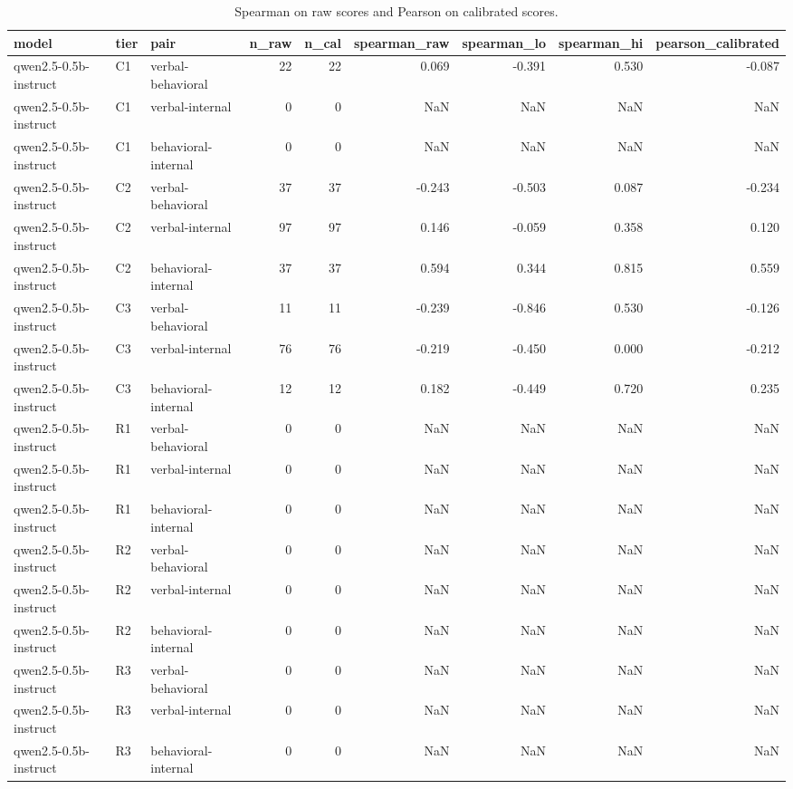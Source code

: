 \begin{table}
\caption{Spearman on raw scores and Pearson on calibrated scores.}
\label{tab:t9_signal_correlations}
\begin{tabular}{lllrrrrrr}
\toprule
model & tier & pair & n\_raw & n\_cal & spearman\_raw & spearman\_lo & spearman\_hi & pearson\_calibrated \\
\midrule
qwen2.5-0.5b-instruct & C1 & verbal-behavioral & 22 & 22 & 0.069 & -0.391 & 0.530 & -0.087 \\
qwen2.5-0.5b-instruct & C1 & verbal-internal & 0 & 0 & NaN & NaN & NaN & NaN \\
qwen2.5-0.5b-instruct & C1 & behavioral-internal & 0 & 0 & NaN & NaN & NaN & NaN \\
qwen2.5-0.5b-instruct & C2 & verbal-behavioral & 37 & 37 & -0.243 & -0.503 & 0.087 & -0.234 \\
qwen2.5-0.5b-instruct & C2 & verbal-internal & 97 & 97 & 0.146 & -0.059 & 0.358 & 0.120 \\
qwen2.5-0.5b-instruct & C2 & behavioral-internal & 37 & 37 & 0.594 & 0.344 & 0.815 & 0.559 \\
qwen2.5-0.5b-instruct & C3 & verbal-behavioral & 11 & 11 & -0.239 & -0.846 & 0.530 & -0.126 \\
qwen2.5-0.5b-instruct & C3 & verbal-internal & 76 & 76 & -0.219 & -0.450 & 0.000 & -0.212 \\
qwen2.5-0.5b-instruct & C3 & behavioral-internal & 12 & 12 & 0.182 & -0.449 & 0.720 & 0.235 \\
qwen2.5-0.5b-instruct & R1 & verbal-behavioral & 0 & 0 & NaN & NaN & NaN & NaN \\
qwen2.5-0.5b-instruct & R1 & verbal-internal & 0 & 0 & NaN & NaN & NaN & NaN \\
qwen2.5-0.5b-instruct & R1 & behavioral-internal & 0 & 0 & NaN & NaN & NaN & NaN \\
qwen2.5-0.5b-instruct & R2 & verbal-behavioral & 0 & 0 & NaN & NaN & NaN & NaN \\
qwen2.5-0.5b-instruct & R2 & verbal-internal & 0 & 0 & NaN & NaN & NaN & NaN \\
qwen2.5-0.5b-instruct & R2 & behavioral-internal & 0 & 0 & NaN & NaN & NaN & NaN \\
qwen2.5-0.5b-instruct & R3 & verbal-behavioral & 0 & 0 & NaN & NaN & NaN & NaN \\
qwen2.5-0.5b-instruct & R3 & verbal-internal & 0 & 0 & NaN & NaN & NaN & NaN \\
qwen2.5-0.5b-instruct & R3 & behavioral-internal & 0 & 0 & NaN & NaN & NaN & NaN \\

\end{tabular}
\end{table}
